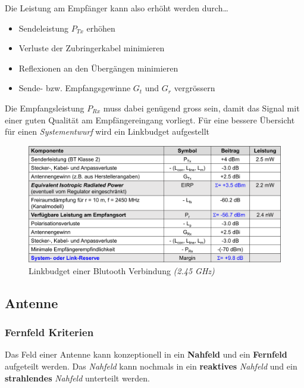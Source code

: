 \documentclass[
  10pt,
  a4paper,
  german]{article}
\numberwithin{equation}{section}
\begin{document}
Die Leistung am Empfänger kann also erhöht werden durch\ldots{}

\begin{itemize}
\item
  Sendeleistung \(P_{Tx}\) erhöhen
\item
  Verluste der Zubringerkabel minimieren
\item
  Reflexionen an den Übergängen minimieren
\item
  Sende- bzw. Empfangsgewinne \(G_t\) und \(G_r\) vergrössern
\end{itemize}

Die Empfangsleistung \(P_{Rx}\) muss dabei genügend gross sein, damit
das Signal mit einer guten Qualität am Empfängereingang vorliegt. Für
eine bessere Übersicht für einen \emph{Systementwurf} wird ein
Linkbudget aufgestellt

\begin{figure}[H]

{\centering \includegraphics{images/04_Linkbudget.png}

}

\caption{Linkbudget einer Blutooth Verbindung \emph{(2.45 GHz)}}

\end{figure}

\hypertarget{antenne}{%
\subsection{Antenne}\label{antenne}}

\hypertarget{fernfeld-kriterien}{%
\subsubsection{Fernfeld Kriterien}\label{fernfeld-kriterien}}

Das Feld einer Antenne kann konzeptionell in ein \textbf{Nahfeld} und
ein \textbf{Fernfeld} aufgeteilt werden. Das \emph{Nahfeld} kann
nochmals in ein \textbf{reaktives} \emph{Nahfeld} und ein
\textbf{strahlendes} \emph{Nahfeld} unterteilt werden.
\end{document}
